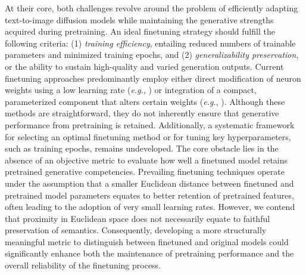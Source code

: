 At their core, both challenges revolve around the problem of efficiently adapting text-to-image diffusion models while maintaining the generative strengths acquired during pretraining. An ideal finetuning strategy should fulfill the following criteria: (1) \emph{training efficiency}, entailing reduced numbers of trainable parameters and minimized training epochs, and (2) \emph{generalizability preservation}, or the ability to sustain high-quality and varied generation outputs. Current finetuning approaches predominantly employ either direct modification of neuron weights using a low learning rate (\emph{e.g.}, \cite{ruiz2023dreambooth}) or integration of a compact, parameterized component that alters certain weights (\emph{e.g.}, \cite{hulora2022,zhang2023adding}). Although these methods are straightforward, they do not inherently ensure that generative performance from pretraining is retained. Additionally, a systematic framework for selecting an optimal finetuning method or for tuning key hyperparameters, such as training epochs, remains undeveloped. The core obstacle lies in the absence of an objective metric to evaluate how well a finetuned model retains pretrained generative competencies. Prevailing finetuning techniques operate under the assumption that a smaller Euclidean distance between finetuned and pretrained model parameters equates to better retention of pretrained features, often leading to the adoption of very small learning rates. However, we contend that proximity in Euclidean space does not necessarily equate to faithful preservation of semantics. Consequently, developing a more structurally meaningful metric to distinguish between finetuned and original models could significantly enhance both the maintenance of pretraining performance and the overall reliability of the finetuning process.


